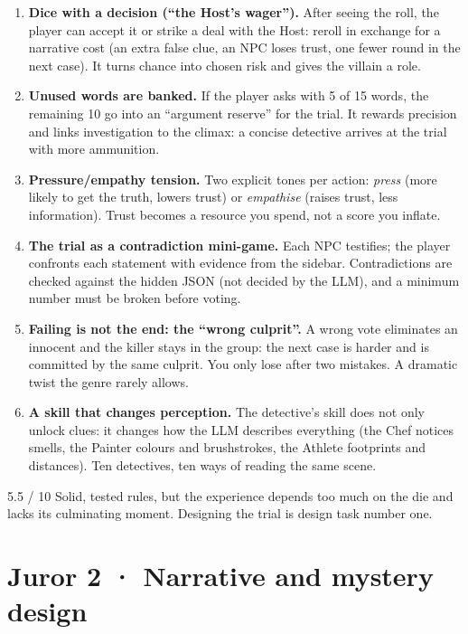 \documentclass[11pt,a4paper]{article}
\begin{document}
\begin{inedito}
\begin{enumerate}
\item \textbf{Dice with a decision (``the Host's wager'').} After seeing the roll, the player can
accept it or strike a deal with the Host: reroll in exchange for a narrative cost (an extra false
clue, an NPC loses trust, one fewer round in the next case). It turns chance into chosen risk and
gives the villain a role.
\item \textbf{Unused words are banked.} If the player asks with 5 of 15 words, the remaining 10 go
into an ``argument reserve'' for the trial. It rewards precision and links investigation to the
climax: a concise detective arrives at the trial with more ammunition.
\item \textbf{Pressure/empathy tension.} Two explicit tones per action: \emph{press} (more likely to
get the truth, lowers trust) or \emph{empathise} (raises trust, less information). Trust becomes a
resource you spend, not a score you inflate.
\item \textbf{The trial as a contradiction mini-game.} Each NPC testifies; the player confronts each
statement with evidence from the sidebar. Contradictions are checked against the hidden JSON (not
decided by the LLM), and a minimum number must be broken before voting.
\item \textbf{Failing is not the end: the ``wrong culprit''.} A wrong vote eliminates an innocent and
the killer stays in the group: the next case is harder and is committed by the same culprit. You
only lose after two mistakes. A dramatic twist the genre rarely allows.
\item \textbf{A skill that changes perception.} The detective's skill does not only unlock clues: it
changes how the LLM describes everything (the Chef notices smells, the Painter colours and
brushstrokes, the Athlete footprints and distances). Ten detectives, ten ways of reading the same
scene.
\end{enumerate}
\end{inedito}

\begin{veredicto}{5.5 / 10}
Solid, tested rules, but the experience depends too much on the die and lacks its culminating moment.
Designing the trial is design task number one.
\end{veredicto}

\section{Juror 2 · Narrative and mystery design}
\end{document}
